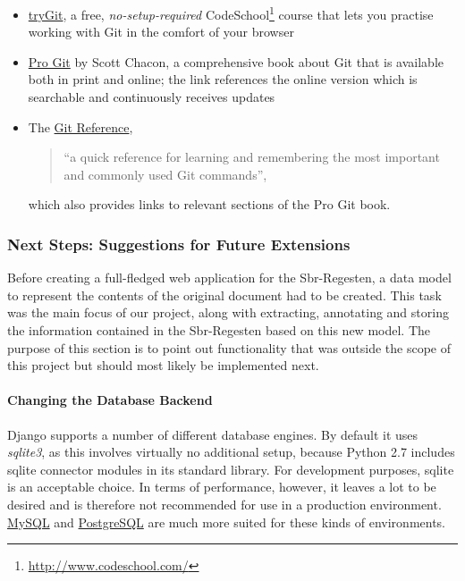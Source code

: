 \begin{itemize}
\item \href{http://try.github.com/levels/1/challenges/1}{tryGit}, a
  free, \emph{no-setup-required}
  CodeSchool\footnote{\url{http://www.codeschool.com/}} course that
  lets you practise working with Git in the comfort of your browser
\item \href{http://git-scm.com/book}{Pro Git} by Scott Chacon, a
  comprehensive book about Git that is available both in print and
  online; the link references the online version which is searchable
  and continuously receives updates
\item The \href{http://gitref.org/}{Git Reference},
  \begin{quote}
    ``a quick reference for learning and remembering the most
    important and commonly used Git commands'',
  \end{quote}
  which also provides links to relevant sections of the Pro Git book.
\end{itemize}

\subsubsection{Next Steps: Suggestions for Future Extensions}
\label{sec:next}

Before creating a full-fledged web application for the Sbr-Regesten, a
data model to represent the contents of the original document had to
be created. This task was the main focus of our project, along with
extracting, annotating and storing the information contained in the
Sbr-Regesten based on this new model. The purpose of this section is
to point out functionality that was outside the scope of this project
but should most likely be implemented next.

\paragraph{Changing the Database Backend}

Django supports a number of different database engines. By default it
uses \emph{sqlite3}, as this involves virtually no additional setup,
because Python 2.7 includes sqlite connector modules in its standard
library. For development purposes, sqlite is an acceptable choice. In
terms of performance, however, it leaves a lot to be desired and is
therefore not recommended for use in a production environment.
\href{http://www.mysql.com/}{MySQL} and
\href{http://www.postgresql.org/}{PostgreSQL} are much more suited for
these kinds of environments.

